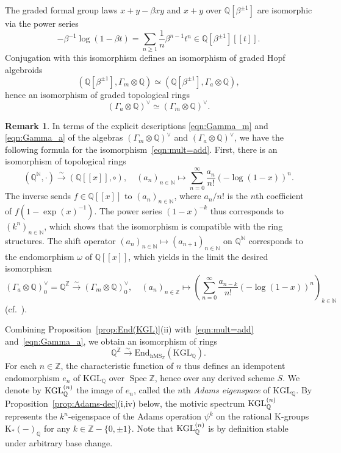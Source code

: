 \documentclass{amsart}
\numberwithin{equation}{section}
\theoremstyle{plain}
\theoremstyle{definition}
\newtheorem{remark}[equation]{Remark}
\let\bb=\mathbb
\def\N{\bb N}
\def\Z{\bb Z}
\def\Q{\bb Q}
\def\h{\mathrm h}
\def\simto{\xrightarrow{\sim}}
\def\End{\mathrm{End}}
\DeclareMathOperator{\Spec}{Spec}
\def\adams#1{{\smash[t]{(#1)}}}
\def\KGL{\mathrm{KGL}}
\def\K{\mathrm{K}{}}
\def\MS{\mathrm{MS}}
\begin{document}
The graded formal group laws $x+y-\beta xy$ and $x+y$ over $\Q[\beta^{\pm 1}]$ are isomorphic via the power series
\[
-\beta^{-1}\log(1-\beta t) = \sum_{n\geq 1}\frac 1n \beta^{n-1}t^n\in \Q[\beta^{\pm 1}][[t]].
\]
Conjugation with this isomorphism defines an isomorphism of graded Hopf algebroids 
\[
(\Q[\beta^{\pm 1}],\Gamma_m\otimes \Q)\simeq (\Q[\beta^{\pm 1}],\Gamma_a\otimes \Q),
\]
hence an isomorphism of graded topological rings 
\begin{equation}\label{eqn:mult=add}
	(\Gamma_a\otimes \Q)^\vee\simeq (\Gamma_m\otimes \Q)^\vee.
\end{equation}

\begin{remark}\label{rmk:mult=add}
	In terms of the explicit descriptions \eqref{eqn:Gamma_m} and \eqref{eqn:Gamma_a} of the algebras $(\Gamma_m\otimes\Q)^\vee$ and $(\Gamma_a\otimes\Q)^\vee$, we have the following formula for the isomorphism~\eqref{eqn:mult=add}. First, there is an isomorphism of topological rings
		\[
		(\Q^\N,{\cdot})\simto (\Q[[x]],{\circ}),\quad (a_n)_{n\in \N}\mapsto \sum_{n=0}^\infty \frac{a_n}{n!}(-\log(1-x))^n.
		\]
	The inverse sends $f\in \Q[[x]]$ to $(a_n)_{n\in\N}$, where $a_n/n!$ is the $n$th coefficient of $f(1-\exp(x)^{-1})$. The power series $(1-x)^{-k}$ thus corresponds to $(k^n)_{n\in\N}$, which shows that the isomorphism is compatible with the ring structures.
	The shift operator $(a_n)_{n\in\N}\mapsto (a_{n+1})_{n\in \N}$ on $\Q^\N$ corresponds to the endomorphism $\omega$ of $\Q[[x]]$, which yields in the limit the desired isomorphism
		\[
		(\Gamma_a\otimes \Q)^\vee_0= \Q^\Z\simto (\Gamma_m\otimes \Q)^\vee_0,\quad (a_n)_{n\in \Z}\mapsto \left(\sum_{n=0}^\infty \frac{a_{n-k}}{n!}(-\log(1-x))^n\right)_{k\in \N}
		\]
	(cf.\ \cite[Proposition 5.3.7]{RiouK}).
\end{remark}

	Combining Proposition~\ref{prop:End(KGL)}(ii) with~\eqref{eqn:mult=add} and~\eqref{eqn:Gamma_a}, we obtain an isomorphism of rings 
	\[\Q^\Z\simto \End_{\h\MS_\Z}(\KGL_\Q).\] 
	For each $n\in \Z$, the characteristic function of $n$ thus defines an idempotent endomorphism $e_n$ of $\KGL_\Q$ over $\Spec\Z$, hence over any derived scheme $S$.
	We denote by $\KGL_\Q^\adams{n}$ the image of $e_n$, called the $n$th \emph{Adams eigenspace} of $\KGL_\Q$. 
	By Proposition~\ref{prop:Adams-dec}(i,iv) below, the motivic spectrum $\KGL_\Q^\adams{n}$ represents the $k^n$-eigenspace of the Adams operation $\psi^k$ on the rational $\K$-groups $\K_*(-)_\Q$ for any $k\in\Z-\{0,\pm 1\}$. Note that $\KGL_\Q^\adams{n}$ is by definition stable under arbitrary base change.
\end{document}
